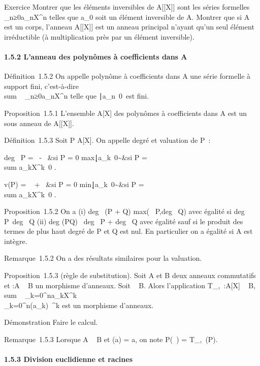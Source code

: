 \documentclass[]{article}
\begin{document}
Exercice Montrer que les éléments inversibles de A{[}{[}X{]}{]} sont les
séries formelles \\\sum
 _n≥0a_nX^n telles que a_0 soit
un élément inversible de A. Montrer que si A est un corps, l'anneau
A{[}{[}X{]}{]} est un anneau principal n'ayant qu'un seul élément
irréductible (à multiplication près par un élément inversible).

\paragraph{1.5.2 L'anneau des polynômes à coefficients dans A}

Définition~1.5.2 On appelle polynôme à coefficients dans A une série
formelle à support fini, c'est-à-dire
\\sum ~
_n≥0a_nX^n telle que
\n∣a_n\mathrel\neq~0\
est fini.

Proposition~1.5.1 L'ensemble A{[}X{]} des polynômes à coefficients dans
A est un sous anneau de A{[}{[}X{]}{]}.

Définition~1.5.3 Soit P \in A{[}X{]}. On appelle degré et valuation de P~:

deg~ P = \left
\ \cases -\infty~ &si P = 0
\cr
max\k∣a_k\mathrel\neq~0\~&si
P = \\sum
a_kX^k\neq~0 
\right .

v(P) = \left \ \cases
+\infty~ &si P = 0 \cr
min\k∣a_k\mathrel\neq~0\~&si
P = \\sum
a_kX^k\neq~0 
\right .

Proposition~1.5.2 On a (i) deg~ (P + Q)
\leq max(\deg~
P,deg~ Q) avec égalité si
deg~
P\neq~deg~ Q (ii)
deg (PQ) \leq\ deg~ P
+ deg~ Q avec égalité sauf si le produit des
termes de plus haut degré de P et Q est nul. En particulier on a égalité
si A est intègre.

Remarque~1.5.2 On a des résultats similaires pour la valuation.

Proposition~1.5.3 (règle de substitution). Soit A et B deux anneaux
commutatifs et \phi:A \rightarrow~ B un morphisme d'anneaux. Soit \beta~ \in B. Alors
l'application T_\phi,\beta~:A{[}X{]} \rightarrow~ B,
\\sum ~
_k=0^na_kX^k\mapsto~\\\sum
 _k=0^n\phi(a_k)\beta~^k est un morphisme
d'anneaux.

Démonstration Faire le calcul.

Remarque~1.5.3 Lorsque A \subset~ B et \phi(a) = a, on note P(\beta~) =
T_\phi,\beta~(P).

\paragraph{1.5.3 Division euclidienne et racines}
\end{document}
